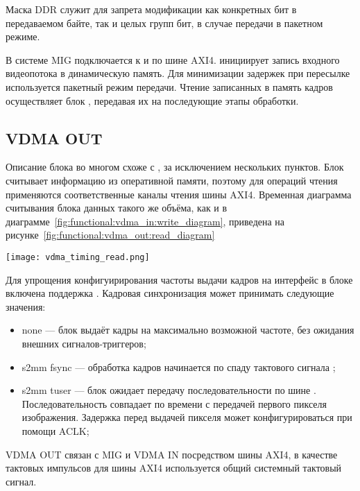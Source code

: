 Маска DDR служит для запрета модификации как конкретных бит в передаваемом байте, так и целых групп
бит, в случае передачи в пакетном режиме.

В системе MIG подключается к  и  по шине AXI4.  инициирует
запись входного видеопотока в динамическую память. Для минимизации задержек при пересылке
используется пакетный режим передачи. Чтение записанных в память кадров осуществляет блок
, передавая их на последующие этапы обработки.

\subsection{VDMA OUT}
\label{sec:functional:vdma_out}

Описание блока  во многом схоже с , за исключением нескольких пунктов.
Блок считывает информацию из оперативной памяти, поэтому для операций чтения применяются
соответственные каналы чтения шины AXI4. Временная диаграмма считывания блока данных такого же
объёма, как и в диаграмме~\ref{fig:functional:vdma_in:write_diagram}, приведена на
рисунке~\ref{fig:functional:vdma_out:read_diagram}

\begin{center}
  \centering
  \texttt{[image: vdma\_timing\_read.png]}
  \label{fig:functional:vdma_out:read_diagram}
\end{center}

Для упрощения конфигуирирования частоты выдачи кадров на  интерфейс в блоке
включена поддержка . Кадровая синхронизация может принимать следующие значения:
\begin{itemize}
  \item none --- блок выдаёт кадры на максимально возможной частоте, без ожидания внешних
    сигналов-триггеров;
  \item s2mm fsync --- обработка кадров начинается по спаду тактового сигнала ;
  \item s2mm tuser --- блок ожидает передачу последовательности  по
    шине . Последовательность совпадает по времени с передачей первого пикселя
    изображения. Задержка перед выдачей пикселя может конфигурироваться при помощи ACLK;
\end{itemize}

VDMA OUT связан с MIG и VDMA IN посредством шины AXI4, в качестве тактовых импульсов для
шины AXI4 используется общий системный тактовый сигнал.

